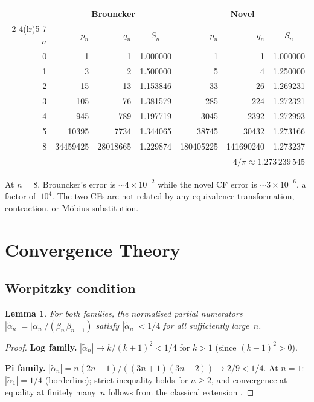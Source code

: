 \documentclass[11pt,a4paper]{article}
\theoremstyle{plain}
\newtheorem{lemma}[theorem]{Lemma}
\theoremstyle{definition}
\theoremstyle{remark}
\begin{document}
\begin{center}
\small
\begin{tabular}{@{}rrrcrrc@{}}
  \toprule
  & \multicolumn{3}{c}{\textbf{Brouncker}} &
    \multicolumn{3}{c}{\textbf{Novel}} \\
  \cmidrule(lr){2-4}\cmidrule(lr){5-7}
  $n$ & $p_n$ & $q_n$ & $S_n$ & $p_n$ & $q_n$ & $S_n$ \\
  \midrule
  0 & 1 & 1 & 1.000000 & 1 & 1 & 1.000000 \\
  1 & 3 & 2 & 1.500000 & 5 & 4 & 1.250000 \\
  2 & 15 & 13 & 1.153846 & 33 & 26 & 1.269231 \\
  3 & 105 & 76 & 1.381579 & 285 & 224 & 1.272321 \\
  4 & 945 & 789 & 1.197719 & 3045 & 2392 & 1.272993 \\
  5 & 10395 & 7734 & 1.344065 & 38745 & 30432 & 1.273166 \\
  8 & 34459425 & 28018665 & 1.229874 &
    180405225 & 141690240 & 1.273237 \\
  \bottomrule
  \multicolumn{7}{r}{$4/\pi \approx 1.273\,239\,545$}
\end{tabular}
\end{center}

\noindent
At $n = 8$, Brouncker's error is $\sim\!4\times 10^{-2}$ while the
novel CF error is $\sim\!3\times 10^{-6}$, a factor of~$10^4$.
The two CFs are not related by any equivalence transformation,
contraction, or M\"obius substitution.

\section{Convergence Theory}\label{sec:conv}

\subsection{Worpitzky condition}

\begin{lemma}\label{lem:worpitzky}
For both families, the normalised partial numerators
$|\tilde\alpha_n| = |\alpha_n|/(\beta_n\,\beta_{n-1})$ satisfy
$|\tilde\alpha_n| < 1/4$ for all sufficiently large~$n$.
\end{lemma}

\begin{proof}
\textbf{Log family.}
$|\tilde\alpha_n| \to k/(k{+}1)^2 < 1/4$ for $k > 1$
(since $(k{-}1)^2 > 0$).

\textbf{Pi family.}
$|\tilde\alpha_n| = n(2n{-}1)/((3n{+}1)(3n{-}2)) \to 2/9 < 1/4$.
At $n = 1$: $|\tilde\alpha_1| = 1/4$ (borderline);
strict inequality holds for $n \ge 2$, and convergence at
equality at finitely many~$n$ follows from the classical
extension \citep[\S4.2]{lorentzen2008}.
\end{proof}
\end{document}
